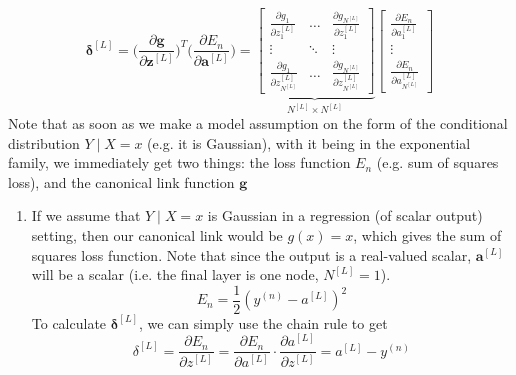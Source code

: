 \begin{algo}[Backpropagation]
\begin{equation}
      \boldsymbol{\delta}^{[L]} = \bigg( \frac{\partial \mathbf{g}}{\partial \mathbf{z}^{[L]}} \bigg)^T \bigg( \frac{\partial E_n}{\partial \mathbf{a}^{[L]}} \bigg) = \underbrace{\begin{bmatrix} \frac{\partial g_1}{\partial z_1^{[L]}} & \ldots & \frac{\partial g_{N^{[L]}}}{\partial z^{[L]}_1} \\ \vdots & \ddots & \vdots \\ \frac{\partial g_1}{\partial z^{[L]}_{N^{[L]}}} & \ldots & \frac{\partial g_{N^{[L]}}}{\partial z^{[L]}_{N^{[L]}}} \end{bmatrix}}_{N^{[L]} \times N^{[L]}} \begin{bmatrix} \frac{\partial E_n}{\partial a_1^{[L]}} \\ \vdots \\ \frac{\partial E_n}{\partial a_{N^{[L]}}^{[L]}} \end{bmatrix}
    \end{equation}
    Note that as soon as we make a model assumption on the form of the conditional distribution $Y \mid X = x$ (e.g. it is Gaussian), with it being in the exponential family, we immediately get two things: the loss function $E_n$ (e.g. sum of squares loss), and the canonical link function $\mathbf{g}$
    \begin{enumerate}
      \item If we assume that $Y \mid X = x$ is Gaussian in a regression (of scalar output) setting, then our canonical link would be $g(x) = x$, which gives the sum of squares loss function. Note that since the output is a real-valued scalar, $\mathbf{a}^{[L]}$ will be a scalar (i.e. the final layer is one node, $N^{[L]} = 1$). 
      \begin{equation}
        E_n = \frac{1}{2} (y^{(n)} - a^{[L]} )^2
      \end{equation}
      To calculate $\boldsymbol{\delta}^{[L]}$, we can simply use the chain rule to get 
      \begin{equation}
        \delta^{[L]} = \frac{\partial E_n}{\partial z^{[L]}} = \frac{\partial E_n}{\partial a^{[L]}} \cdot \frac{\partial a^{[L]}}{\partial z^{[L]}} = a^{[L]} - y^{(n)}
      \end{equation}


\end{enumerate}
\end{algo}
